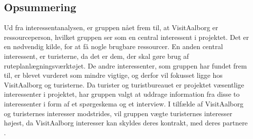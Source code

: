 \subsection{Opsummering}
Ud fra interessentanalysen, er gruppen nået frem til, at VisitAalborg er ressourceperson, hvilket gruppen ser som en central interessent i projektet. Det er en nødvendig kilde, for at få nogle brugbare ressourcer. En anden central interessent, er turisterne, da det er dem, der skal gøre brug af ruteplanlægningsværktøjet. 
De andre interessenter, som gruppen har fundet frem til, er blevet vurderet som mindre vigtige, og derfor vil fokusset ligge hos VisitAalborg og turisterne.
Da turister og turistbureauet er projektet væsentlige interessenter i projektet, har gruppen valgt at uddrage information fra disse to interessenter i form af et spørgeskema og et interview. 
I tilfælde af VisitAalborg og turisternes interesser modstrides, vil gruppen vægte turisternes interesser højest, da VisitAalborg interesser kan skyldes deres kontrakt, med deres partnere \citep{VA}. 




